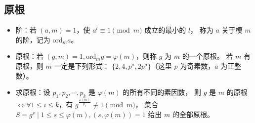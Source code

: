 \subsection{原根}
\begin{itemize}
\item 阶：若 $(a,m) = 1$，使 $a^l \equiv 1 \pmod m$ 成立的最小的 $l$，
  称为 $a$ 关于模 $m$ 的阶，记为 $\text{ord}_m a$。
\item 原根：若 $(g, m) = 1, \text{ord}_m g = \varphi(m)$，则称 $g$ 为 $m$ 的一个原根。
  若 $m$ 有原根，则 $m$ 一定是下列形式：
  $\{2, 4, p^a, 2p^a\}$（这里 $p$ 为奇素数，$a$ 为正整数）。
\item 求原根：设 $p_1, p_2, \cdots, p_k$ 是 $\varphi(m)$ 的所有不同的素因数，
  则 $g$ 是 $m$ 的原根 $ \iff \forall 1 \leq i \leq k$，有 $g^{\frac{\varphi(m)}{p_i}} \not\equiv 1 \pmod m$，
  集合 $S = {g^s \mid 1 \leq s \leq \varphi(m), (s, \varphi(m)) = 1}$ 给出 $m$ 的全部原根。
\end{itemize}